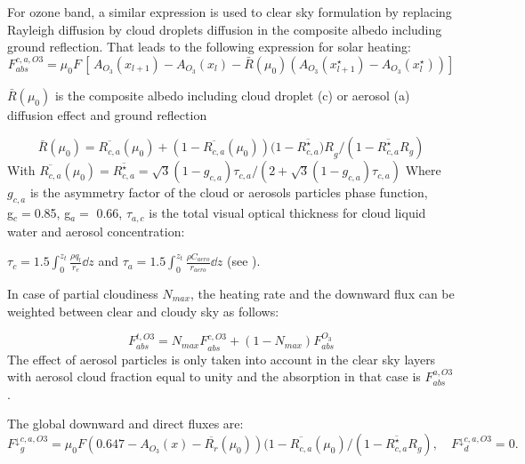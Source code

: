 For ozone band, a similar expression is used to clear sky formulation by
replacing Rayleigh diffusion by cloud droplets diffusion in the composite
albedo including ground reflection. That leads to the following expression
for solar heating:
\begin{equation}
F_{abs}^{c,a,O3}=\mu_{0}F\, [\, A_{O_{3}}\left( x_{l+1} \right)-A_{O_{3}}\left(
x_{l} \right)-\bar{R}(\mu_{0})\left( A_{O_{3}}\left( x_{l+1}^{\star }
\right)-A_{O_{3}}\left( x_{l}^{\star } \right) \right)]
\end{equation}

$\bar{R}(\mu_{0})$ is the composite albedo including cloud droplet (c) or
aerosol (a) diffusion effect and ground reflection

\begin{equation}
\bar{R}\left( \mu_{0} \right)=\overline{R_{c,a}}\left( \mu_{0}
\right)+(1-\overline{R_{c,a}}\left( \mu_{0} \right))(1-\overline{R_{c,a}^{\star
}}{)R}_{g}/(1-\overline{R_{c,a}^{\star }}R_{g})
\end{equation}
With $\overline{R_{c,a}}\left( \mu_{0} \right)=\overline{R_{c,a}^{\star }}=\sqrt 3
\left( 1-g_{c,a} \right)\tau_{c,a}/(2+\sqrt 3 \left( 1-g_{c,a} \right)\tau
_{c,a})$
Where $g_{c,a}$ is the asymmetry factor of the cloud or aerosols
particles phase function, \\
g$_{c}=$0.85, g$_{a}=$ 0.66, $\tau_{a,c}$ is the total visual optical thickness
for cloud liquid water and aerosol concentration:

$\tau_{c}=1.5\int_0^{z_t} \frac{\rho q_{l}}{r_{e}} \dd z$ and $\tau
_{a}=1.5\int_0^{z_t} \frac{\rho C_{aero}}{r_{aero}} \dd z$ (see \cite{Stephens:1984}).

In case of partial cloudiness $N_{max}$, the heating rate and the downward
flux can be weighted between clear and cloudy sky as follows:

\begin{equation}
F_{abs}^{t,O3}={N_{max}F}_{abs}^{c,O3}+(1-N_{max})F_{abs}^{O_{3}}
\end{equation}
The effect of aerosol particles is only taken into account in the clear sky
layers with aerosol cloud fraction equal to unity and the absorption in that
case is $F_{abs}^{a,O3}$.

The global downward and direct fluxes are:
\begin{equation}
{F^\downarrow }_{g}^{c,a,O3}=\mu_{0}F(0.647-A_{O_{3}}\left( x
\right)-\overline{R_{r}}\left( \mu_{0} \right))(1-\overline{R_{c,a}}\left( \mu_{0}
\right)/(1-\overline{R_{c,a}^{\star }}R_{g}),\quad
{F^\downarrow }_{d}^{c,a,O3}=0.
\end{equation}

